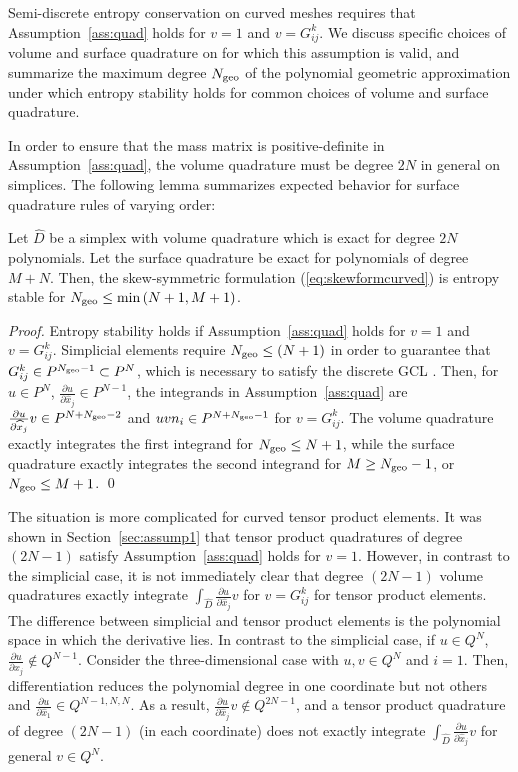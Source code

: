 \documentclass{svjour3}                     %
\renewcommand{\hat}{\widehat}
\newcommand{\pd}[2]{\frac{\partial#1}{\partial#2}}
\newcommand{\LRp}[1]{\left( #1 \right)}
\renewcommand{\note}[1]{{\color{blue}{#1}}}
\begin{document}
Semi-discrete entropy conservation on curved meshes requires that Assumption~\ref{ass:quad} holds for $v = 1$ and $v = G^k_{ij}$.  We discuss specific choices of volume and surface quadrature on for which this assumption is valid, and summarize the maximum degree $N_{\rm geo}$ of the polynomial geometric approximation under which entropy stability holds for common choices of volume and surface quadrature.  

In order to ensure that the mass matrix is positive-definite in Assumption~\ref{ass:quad}, the volume quadrature must be degree $2N$ in general on simplices.  The following lemma summarizes expected behavior for surface quadrature rules of varying order:
\begin{lemma}
Let $\hat{D}$ be a simplex with volume quadrature which is exact for degree $2N$ polynomials.  Let the surface quadrature be exact for polynomials of degree $M+N$.  Then, the skew-symmetric formulation (\ref{eq:skewformcurved}) is entropy stable for $N_{\rm geo} \leq \min\LRp{N+1,M+1}$.
\label{lemma:curvsimp}
\end{lemma}
\begin{proof}
Entropy stability holds if Assumption~\ref{ass:quad} holds for $v = 1$ and $v = G^k_{ij}$.  
Simplicial elements require $N_{\rm geo}\leq (N+1)$ in order to guarantee that $G^k_{ij}\in P^{N_{\rm geo}-1} \subset P^{N}$, which is necessary to satisfy the discrete GCL \cite{chan2018discretely}.  Then, for $u \in P^N$, $\pd{u}{\hat{x}_j}\in P^{N-1}$, the integrands in Assumption~\ref{ass:quad} are $\pd{u}{\hat{x}_j} v \in P^{N+N_{\rm geo}-2}$ and $uv n_i \in P^{N+N_{\rm geo}-1}$ for $v = G^k_{ij}$.  The volume quadrature exactly integrates the first integrand for $N_{\rm geo} \leq N+1$, while the surface quadrature exactly integrates the second integrand for $M \geq N_{\rm geo}-1$, or $N_{\rm geo} \leq M+1$.
\qed\end{proof}

The situation is more complicated for curved tensor product elements.  It was shown in Section~\ref{sec:assump1} that tensor product quadratures of degree $(2N-1)$ satisfy Assumption~\ref{ass:quad} holds for $v = 1$.  However, in contrast to the simplicial case, it is not immediately clear that degree $(2N-1)$ volume quadratures exactly integrate $\int_{\hat{D}} \pd{u}{\hat{x}_j}v$ for $v = G^k_{ij}$ for tensor product elements.  The difference between simplicial and tensor product elements is the polynomial space in which the derivative lies.  In contrast to the simplicial case, if $u \in Q^N$, $\pd{u}{\hat{x}_j} \not\in Q^{N-1}$.  Consider the three-dimensional case with $u, v \in Q^N$ and $i = 1$.  Then, differentiation reduces the polynomial degree in one coordinate but not others and $\pd{u}{\hat{x}_1} \in Q^{N-1,N,N}$.  As a result, $\pd{u}{\hat{x}_j}v \not\in Q^{2N-1}$, and a tensor product quadrature of degree $(2N-1)$ (in each coordinate) does not exactly integrate $\int_{\hat{D}} \pd{u}{\hat{x}_j}v$ for general $v\in Q^N$.  
\end{document}
